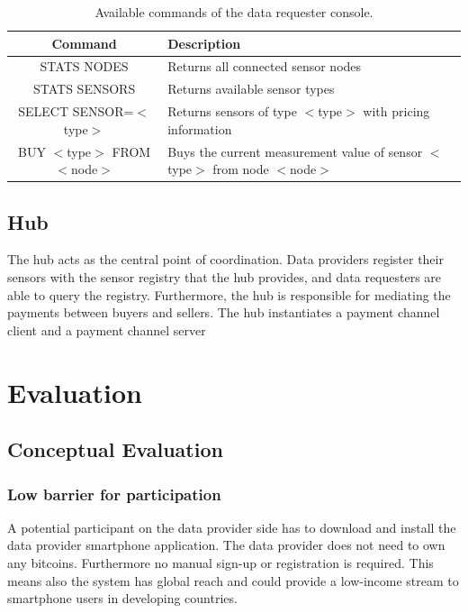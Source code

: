 \documentclass[10pt,journal,compsoc]{IEEEtran}
\newcommand\tabhead[1]{\small\textbf{#1}}
\begin{document}
\begin{table}
  \centering
    \caption{Available commands of the data requester console.}
  \begin{tabular}{|c|l|}
    \hline
    \tabhead{Command} &
    \tabhead{Description} \\
    \hline
    STATS NODES & Returns all connected sensor nodes \\
    \hline
    STATS SENSORS & Returns available sensor types \\
    \hline
    SELECT SENSOR=$<$type$>$ & \multicolumn{1}{|p{0.5\columnwidth}|}{Returns sensors of type $<$type$>$ with pricing information} \\
    \hline
    BUY $<$type$>$ FROM $<$node$>$ & \multicolumn{1}{|p{0.5\columnwidth}|}{Buys the current measurement value of sensor $<$type$>$ from node $<$node$>$} \\
    \hline
   
    \hline
  \end{tabular}
  \label{tbl:commands}
\end{table}



\subsection{Hub}
The hub acts as the central point of coordination. Data providers register their sensors with the sensor registry that the hub provides, and data requesters are able to query the registry. Furthermore, the hub is responsible for mediating the payments between buyers and sellers. The hub instantiates a payment channel client and a payment channel server





\section{Evaluation}

\subsection{Conceptual Evaluation}

\subsubsection{Low barrier for participation}
A potential participant on the data provider side has to download and install the data provider smartphone application. The data provider does not need to own any bitcoins. Furthermore no manual sign-up or registration is required. This means also the system has global reach and could provide a low-income stream to smartphone users in developing countries.
\end{document}

